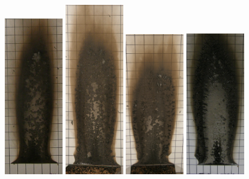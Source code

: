 \documentclass[twoside]{uocthesis}
\begin{document}
\begin{figure}[p]
	\includegraphics[width=1.0in]{../Figures/GBNG6_P5120160}
	\includegraphics[width=1.0in]{../Figures/GBNG7_P5120172}
	\includegraphics[width=1.0in]{../Figures/GBNG8_P5120196}
	\includegraphics[width=1.0in]{../Figures/GBNG10_P5120251}

\end{figure}
\end{document}
